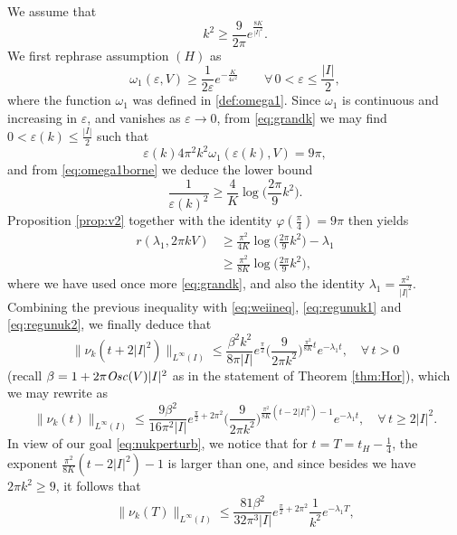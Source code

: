 \documentclass[12pt]{article}
\newcommand{\eps}{\varepsilon}
\begin{document}
 We assume that
\begin{equation}\label{eq:grandk}
k^2 \geq \frac{9}{2\pi}e^\frac{8K}{|I|^2}.
\end{equation}
We first rephrase assumption $(H)$ as 
\begin{equation}\label{eq:omega1borne}
\omega_1(\eps, V) \geq \frac{1}{2\eps}e^{-\frac{K}{4\eps^2}} \qquad\forall\, 0 <
\eps \leq \frac{|I|}{2},
\end{equation}
where the function $\omega_1$ was defined in \eqref{def:omega1}. Since $\omega_1$ 
is continuous and increasing in $\eps$, and vanishes as $\eps \to 0$, from 
\eqref{eq:grandk} we may find $0< \eps(k) \leq \frac{|I|}{2}$ such that 
$$
\eps(k)4\pi^2k^2\omega_1(\eps(k), V) = 9\pi,
$$
and from \eqref{eq:omega1borne} we deduce the lower bound
$$
\frac{1}{\eps(k)^2} \geq \frac{4}{K}\log\Big(\frac{2\pi}{9}k^2\Big). 
$$
Proposition \ref{prop:v2} together with the identity $\varphi(\frac{\pi}{4}) =
9\pi$ then yields 
\begin{equation*}\label{eq:borner1}\begin{split}
r(\lambda_1, 2\pi k V) &\geq \frac{\pi^2}{4K}\log\Big(\frac{2\pi}{9}k^2\Big) -
\lambda_1\\
&\geq \frac{\pi^2}{8K}\log\Big(\frac{2\pi}{9}k^2\Big),
\end{split}\end{equation*}
where we have used once more \eqref{eq:grandk}, and also the identity $\lambda_1 =
\frac{\pi^2}{|I|^2}.$ Combining the previous inequality with
\eqref{eq:weiineq}, \eqref{eq:regunuk1} and \eqref{eq:regunuk2}, we finally deduce that
$$
\|\nu_k(t + 2|I|^2)\|_{L^\infty(I)} \leq \frac{\beta^2 k^2}{8\pi|I|}
e^{\frac{\pi}{2}} \Big(\frac{9}{2\pi k^2}\Big)^{\frac{\pi^2}{8K}t} e^{-\lambda_1
t}, \quad \forall\, t > 0
$$
(recall $\beta = 1 + 2\pi{\it Osc}(V)|I|^2$ as in the statement of Theorem \ref{thm:Hor}), which 
we may rewrite as
$$
\|\nu_k(t)\|_{L^\infty(I)} \leq \frac{9\beta^2}{16\pi^2|I|}
e^{\frac{\pi}{2} + 2\pi^2} \Big(\frac{9}{2\pi
k^2}\Big)^{\frac{\pi^2}{8K}(t-2|I|^2) - 1} e^{-\lambda_1 t}, \quad \forall\, t
\geq 2|I|^2.
$$
In view of our goal \eqref{eq:nukperturb}, we notice that for $t = T = t_H -
\frac14$, the exponent $\frac{\pi^2}{8K}(t-2|I|^2) - 1$ is larger than one, 
and since besides we have $2\pi k^2 \geq 9$, it follows that
\begin{equation*}
\|\nu_k(T)\|_{L^\infty(I)} \leq \frac{81\beta^2}{32\pi^3|I|}
e^{\frac{\pi}{2} + 2\pi^2} \frac{1}{k^2} e^{-\lambda_1 T},
\end{equation*}
\end{document}
